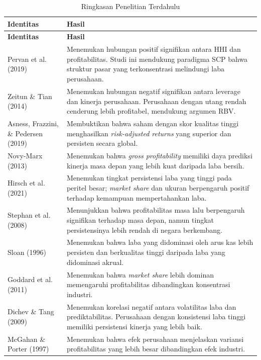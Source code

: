 \documentclass[12pt,a4paper]{report}
\begin{document}
\begin{longtable}{>{\raggedright\arraybackslash}p{} >{\raggedright\arraybackslash}p{}}
\caption{Ringkasan Penelitian Terdahulu}\label{tab:ringkasan-penelitian-terdahulu}\\
\toprule
\textbf{Identitas} & \textbf{Hasil} \\
\midrule
\endfirsthead
\toprule
\textbf{Identitas} & \textbf{Hasil} \\
\midrule
\endhead
Pervan et al. (2019) & Menemukan hubungan positif signifikan antara HHI dan profitabilitas. Studi ini mendukung paradigma SCP bahwa struktur pasar yang terkonsentrasi melindungi laba perusahaan. \\
Zeitun \& Tian (2014) & Menemukan hubungan negatif signifikan antara leverage dan kinerja perusahaan. Perusahaan dengan utang rendah cenderung lebih profitabel, mendukung argumen RBV. \\
Asness, Frazzini, \& Pedersen (2019) & Membuktikan bahwa saham dengan skor kualitas tinggi menghasilkan \textit{risk-adjusted returns} yang superior dan persisten secara global. \\
Novy-Marx (2013) & Menemukan bahwa \textit{gross profitability} memiliki daya prediksi kinerja masa depan yang lebih kuat daripada laba bersih. \\
Hirsch et al. (2021) & Menemukan tingkat persistensi laba yang tinggi pada peritel besar; \textit{market share} dan ukuran berpengaruh positif terhadap kemampuan mempertahankan laba. \\
Stephan et al. (2008) & Menunjukkan bahwa profitabilitas masa lalu berpengaruh signifikan terhadap masa depan, namun tingkat persistensinya lebih rendah di negara berkembang. \\
Sloan (1996) & Menemukan bahwa laba yang didominasi oleh arus kas lebih persisten dan berkualitas tinggi daripada laba yang didominasi akrual. \\
Goddard et al. (2011) & Menemukan bahwa \textit{market share} lebih dominan memengaruhi profitabilitas dibandingkan konsentrasi industri. \\
Dichev \& Tang (2009) & Menemukan korelasi negatif antara volatilitas laba dan prediktabilitas. Perusahaan dengan konsistensi laba tinggi memiliki persistensi kinerja yang lebih baik. \\
McGahan \& Porter (1997) & Menemukan bahwa efek perusahaan menjelaskan variansi profitabilitas yang lebih besar dibandingkan efek industri. \\
\bottomrule
\end{longtable}
\end{document}
